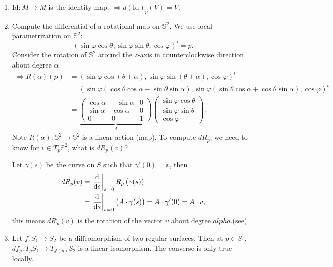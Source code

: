 \begin{exercise}
    \hfill
    \begin{enumerate}[(1)]
        \item \(\mathrm{Id}\colon M\to M\) is the identity map.
        \(\Rightarrow d(\mathrm{Id})_p(V)=V\).
        \item \label{computation of a differential}
        Compute the differential of a rotational map on 
        \(\mathbb{S}^2\). We use local parametrization on 
        \(\mathbb{S}^2\): 
        \[\left(\sin\varphi\cos\theta,
        \sin\varphi\sin\theta,\cos\varphi\right)^t=p.\]
        Consider the rotation of \(\mathbb{S}^2\) around the 
        \(z\)-axis in counterclockwise direction about degree
        \(\alpha\)
        \begin{align*}
            \Rightarrow R(\alpha)(p)&=
            \left(\sin\varphi\cos(\theta+\alpha),
            \sin\varphi\sin(\theta+\alpha),\cos\varphi\right)^t\\
            &=\left(\sin\varphi\left(\cos\theta\cos\alpha-
            \sin\theta\sin\alpha\right),\sin\varphi\left(
                \sin\theta\cos\alpha+\cos\theta\sin\alpha
            \right),\cos\varphi\right)^t\\
            &=\underbrace{
            \begin{pmatrix}
                \cos\alpha & -\sin\alpha &0 \\
                \sin\alpha & \cos\alpha & 0\\
                0 & 0 & 1
            \end{pmatrix}}_{A}
            \begin{pmatrix}
                \sin\varphi\cos\theta\\
                \sin\varphi\sin\theta\\
                \cos\varphi
            \end{pmatrix}
        .\end{align*}
        Note \(R(\alpha)\colon \mathbb{S}^2\to \mathbb{S}^2\)
        is a linear action (map). To compute \(dR_p\), we need
        to know for \(v \in T_p\mathbb{S}^2\), what is 
        \(dR_p(v)\)?

        Let \(\gamma(s)\) be the curve on \(S\) such that 
        \(\gamma'(0)=v\), then
            \begin{align*}
                dR_p(v)&=\left.\dv{s}\right|_{s=0}
                R_p\left(\gamma(s)\right)\\
                &=\left.\dv{s}\right|_{s=0}\left(A\cdot \gamma(s)\right)
                =A\cdot \gamma'(0)=A\cdot v
            ,\end{align*}
            this means \(dR_p(v)\) is the rotation of the vector 
            \(v\) about degree \(alpha\).(see)
            \item Let \(f\colon S_1\to S_2\) be a diffeomorphism
            of two regular surfaces. Then at \(p\in S_1\), 
            \(df_p \colon T_p S_1\to T_{f(p)}S_2\) is a linear 
            isomorphism. The converse is only true locally.
    \end{enumerate}
\end{exercise}
